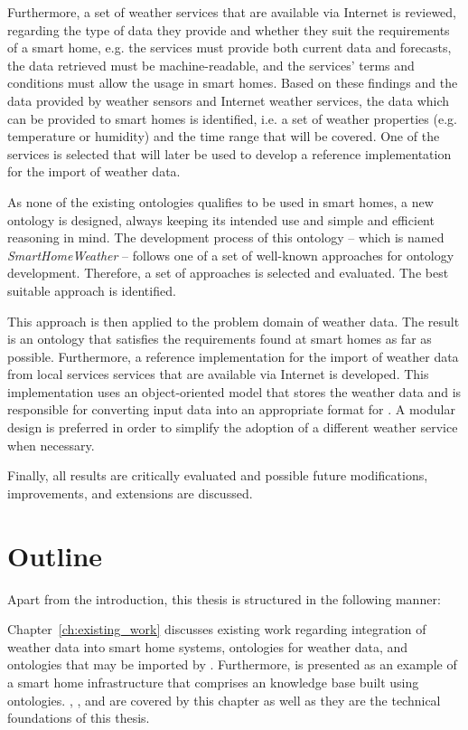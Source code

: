Furthermore, a set of weather services that are available via Internet is reviewed, regarding the type of data they provide and whether they suit the requirements of a smart home, e.g. the services must provide both current data and forecasts, the data retrieved must be machine-readable, and the services' terms and conditions must allow the usage in smart homes. Based on these findings and the data provided by weather sensors and Internet weather services, the data which can be provided to smart homes is identified, i.e. a set of weather properties (e.g. temperature or humidity) and the time range that will be covered. One of the services is selected that will later be used to develop a reference implementation for the import of weather data.

As none of the existing ontologies qualifies to be used in smart homes, a new  ontology is designed, always keeping its intended use and simple and efficient reasoning in mind. The development process of this ontology -- which is named \emph{SmartHomeWeather} -- follows one of a set of well-known approaches for ontology development. Therefore, a set of approaches is selected and evaluated. The best suitable approach is identified.

This approach is then applied to the problem domain of weather data. The result is an ontology that satisfies the requirements found at smart homes as far as possible. Furthermore, a reference implementation for the import of weather data from local services services that are available via Internet is developed. This implementation uses an object-oriented model that stores the weather data and is responsible for converting input data into an appropriate format for \smarthomeweather. A modular design is preferred in order to simplify the adoption of a different weather service when necessary.

Finally, all results are critically evaluated and possible future modifications, improvements, and extensions are discussed.

\section{Outline}

Apart from the introduction, this thesis is structured in the following manner:

Chapter~\ref{ch:existing_work} discusses existing work regarding integration of weather data into smart home systems, ontologies for weather data, and ontologies that may be imported by \smarthomeweather. Furthermore, \thinkhome is presented as an example of a smart home infrastructure that comprises an knowledge base built using ontologies. , , and  are covered by this chapter as well as they are the technical foundations of this thesis.


